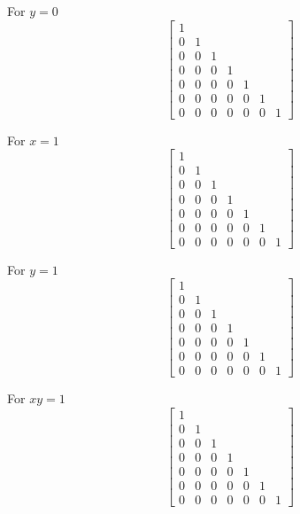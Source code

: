\documentclass[main]{subfiles}
\begin{document}
For $y=0$
\[
\begin{bmatrix}
1 \\
0&1 \\
0&0&1 \\
0&0&0&1 \\
0&0&0&0&1 \\
0&0&0&0&0&1 \\
0&0&0&0&0&0&1
\end{bmatrix}
\]

For $x=1$
\[
\begin{bmatrix}
1 \\
0&1 \\
0&0&1 \\
0&0&0&1 \\
0&0&0&0&1 \\
0&0&0&0&0&1 \\
0&0&0&0&0&0&1
\end{bmatrix}
\]

For $y=1$
\[
\begin{bmatrix}
1 \\
0&1 \\
0&0&1 \\
0&0&0&1 \\
0&0&0&0&1 \\
0&0&0&0&0&1 \\
0&0&0&0&0&0&1
\end{bmatrix}
\]

For $xy=1$
\[
\begin{bmatrix}
1 \\
0&1 \\
0&0&1 \\
0&0&0&1 \\
0&0&0&0&1 \\
0&0&0&0&0&1 \\
0&0&0&0&0&0&1
\end{bmatrix}
\]
\end{document}
